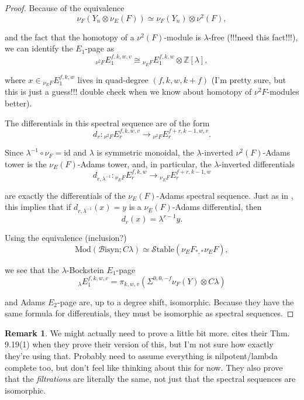 \documentclass[10pt]{amsart}
\theoremstyle{definition}
\numberwithin{figure}{section}
\numberwithin{equation}{section}
\newtheorem{rem}[figure]{Remark}
\theoremstyle{cited}
\newcommand{\bZ}{\mathbb{Z}}
\newcommand{\Mod}{\mathrm{Mod}}
\newcommand{\Bisyn}{\mathcal{B}\mathrm{isyn}}
\newcommand{\Stable}{\mathcal{S}\mathrm{table}}
\begin{document}
\begin{proof}
Because of the equivalence
$$
\nu_F(Y_n\otimes\nu_E(F))\simeq\nu_F(Y_n)\otimes\nu^2(F),
$$

and the fact that the homotopy of a $\nu^2(F)$-module is $\lambda$-free (!!!need this fact!!!), we can identify the $E_1$-page as
$$
{}_{\nu^2F}E_1^{f,k,w,v}\cong {}_{\nu_EF}E_1^{f,k,w}\otimes \bZ[\lambda],
$$

where $x\in{}_{\nu_EF}E_1^{f,k,w}$ lives in quad-degree $(f,k,w,k+f)$ (I'm pretty sure, but this is just a guess!!! double check when we know about homotopy of $\nu^2F$-modules better).

The differentials in this spectral sequence are of the form
$$
d_r:{}_{\nu^2F}E_r^{f,k,w,v}\to {}_{\nu^2F}E_r^{f+r,k-1,w,v}.
$$

Since $\lambda^{-1}\circ\nu_F=\mathrm{id}$ and $\lambda$ is symmetric monoidal, the $\lambda$-inverted $\nu^2(F)$-Adams tower is the $\nu_E(F)$-Adams tower, and, in particular, the $\lambda$-inverted differentials 
$$
d_{r,\lambda^{-1}}:{}_{\nu_EF}E_r^{f,k,w}\to{}_{\nu_EF}E_r^{f+r,k-1,w}
$$

are exactly the differentials of the $\nu_E(F)$-Adams spectral sequence. Just as in \cite{BHS19}, this implies that if $d_{r,\lambda^{-1}}(x)=y$ is a $\nu_E(F)$-Adams differential, then
$$
d_r(x)=\lambda^{r-1}y.
$$

Using the equivalence (inclusion?)
$$
\Mod(\Bisyn;C\lambda)\simeq\Stable(\nu_EF_{*,*}\nu_EF),
$$

we see that the $\lambda$-Bockstein $E_1$-page
$$
{}_{\lambda}E_1^{f,k,w,v}=\pi_{k,w,v}(\Sigma^{0,0,-f}\nu_F(Y)\otimes C\lambda)
$$

and Adams $E_2$-page are, up to a degree shift, isomorphic. Because they have the same formula for differentials, they must be isomorphic as spectral sequences.
\end{proof}

\begin{rem}
We might actually need to prove a little bit more. \cite{BHS19} cites their Thm. 9.19(1) when they prove their version of this, but I'm not sure how exactly they're using that. Probably need to assume everything is nilpotent/lambda complete too, but don't feel like thinking about this for now. They also prove that the \textit{filtrations} are literally the same, not just that the spectral sequences are isomorphic.
\end{rem}
\end{document}
